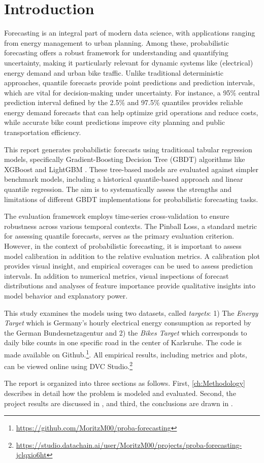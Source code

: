 \section{Introduction}
\label{ch:Introduction}


Forecasting is an integral part of modern data science, with applications ranging from energy management to urban planning. Among these, probabilistic forecasting offers a robust framework for understanding and quantifying uncertainty, making it particularly relevant for dynamic systems like (electrical) energy demand and urban bike traffic. Unlike traditional deterministic approaches, quantile forecasts provide point predictions and prediction intervals, which are vital for decision-making under uncertainty. For instance, a 95\% central prediction interval defined by the 2.5\% and 97.5\% quantiles provides reliable energy demand forecasts that can help optimize grid operations and reduce costs, while accurate bike count predictions improve city planning and public transportation efficiency.

This report generates probabilistic forecasts using traditional tabular regression models, specifically Gradient-Boosting Decision Tree (GBDT) algorithms like XGBoost \parencite{chen_xgboost_2016} and LightGBM \parencite{ke_lightgbm_2017}. These tree-based models are evaluated against simpler benchmark models, including a historical quantile-based approach and linear quantile regression. The aim is to systematically assess the strengths and limitations of different GBDT implementations for probabilistic forecasting tasks.

The evaluation framework employs time-series cross-validation to ensure robustness across various temporal contexts. The Pinball Loss, a standard metric for assessing quantile forecasts, serves as the primary evaluation criterion. However, in the context of probabilistic forecasting, it is important to assess model calibration in addition to the relative evaluation metrics. A calibration plot provides visual insight, and empirical coverages can be used to assess prediction intervals.
In addition to numerical metrics, visual inspections of forecast distributions and analyses of feature importance provide qualitative insights into model behavior and explanatory power.

This study examines the models using two datasets, called \textit{targets}: 1) The \textit{Energy Target} which is Germany's hourly electrical energy consumption \parencite{noauthor_smard_2025} as reported by the German Bundesnetzagentur and 2) the \textit{Bikes Target} which corresponds to daily bike counts in one specific road in the center of Karlsruhe.
The code is made available on Github.\footnote{\href{https://github.com/MoritzM00/proba-forecasting}{https://github.com/MoritzM00/proba-forecasting}}. All empirical results, including metrics and plots, can be viewed online using DVC Studio.\footnote{\href{https://studio.datachain.ai/user/MoritzM00/projects/proba-forecasting-jclqxio6ht}{https://studio.datachain.ai/user/MoritzM00/projects/proba-forecasting-jclqxio6ht}}

The report is organized into three sections as follows. First, \cref{ch:Methodology} describes in detail how the problem is modeled and evaluated. Second, the project results are discussed in , and third, the conclusions are drawn in .